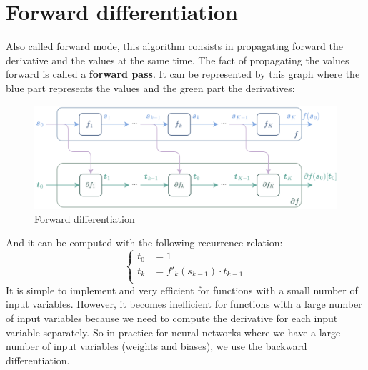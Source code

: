 \documentclass[12pt, openany]{report}
\theoremstyle{definition}
\begin{document}
\section{Forward differentiation}
Also called forward mode, this algorithm consists in propagating forward the derivative and the values at the same time. The fact of propagating the values forward is called a \textbf{forward pass}. It can be represented by this graph where the blue part represents the values and the green part the derivatives:
\begin{figure}[H]
    \centering
    \includegraphics[width=\textwidth]{img/forward_diff.png}
    \caption{Forward differentiation}
    \label{fig:forward_diff}
\end{figure}
And it can be computed with the following recurrence relation:
\begin{equation}
  \begin{cases}
    t_0 &= 1 \\
    t_k &= f'_k(s_{k-1}) \cdot t_{k-1}\\
  \end{cases}
\end{equation}
It is simple to implement and very efficient for functions with a small number of input variables. However, it becomes inefficient for functions with a large number of input variables because we need to compute the derivative for each input variable separately. So in practice for neural networks where we have a large number of input variables (weights and biases), we use the backward differentiation.
\end{document}

